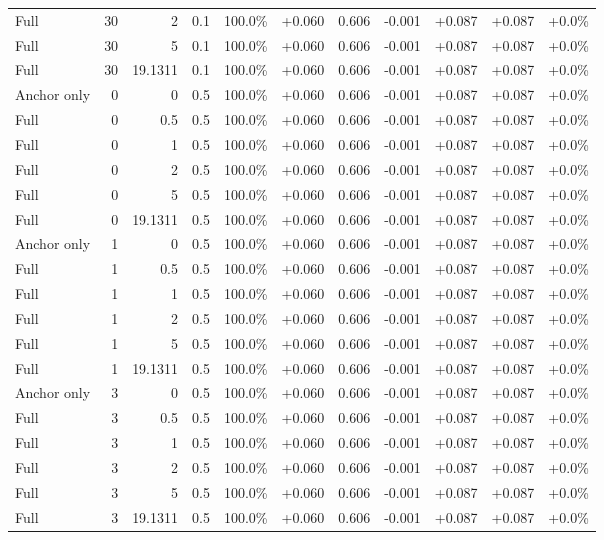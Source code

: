 \begin{table}[htbp]
\begin{tabular}{lrrrccccccc}
Full & 30 & 2 & 0.1 & 100.0\% & +0.060 & 0.606 & -0.001 & +0.087 & +0.087 & +0.0\% \\
Full & 30 & 5 & 0.1 & 100.0\% & +0.060 & 0.606 & -0.001 & +0.087 & +0.087 & +0.0\% \\
Full & 30 & 19.1311 & 0.1 & 100.0\% & +0.060 & 0.606 & -0.001 & +0.087 & +0.087 & +0.0\% \\
Anchor only & 0 & 0 & 0.5 & 100.0\% & +0.060 & 0.606 & -0.001 & +0.087 & +0.087 & +0.0\% \\
Full & 0 & 0.5 & 0.5 & 100.0\% & +0.060 & 0.606 & -0.001 & +0.087 & +0.087 & +0.0\% \\
Full & 0 & 1 & 0.5 & 100.0\% & +0.060 & 0.606 & -0.001 & +0.087 & +0.087 & +0.0\% \\
Full & 0 & 2 & 0.5 & 100.0\% & +0.060 & 0.606 & -0.001 & +0.087 & +0.087 & +0.0\% \\
Full & 0 & 5 & 0.5 & 100.0\% & +0.060 & 0.606 & -0.001 & +0.087 & +0.087 & +0.0\% \\
Full & 0 & 19.1311 & 0.5 & 100.0\% & +0.060 & 0.606 & -0.001 & +0.087 & +0.087 & +0.0\% \\
Anchor only & 1 & 0 & 0.5 & 100.0\% & +0.060 & 0.606 & -0.001 & +0.087 & +0.087 & +0.0\% \\
Full & 1 & 0.5 & 0.5 & 100.0\% & +0.060 & 0.606 & -0.001 & +0.087 & +0.087 & +0.0\% \\
Full & 1 & 1 & 0.5 & 100.0\% & +0.060 & 0.606 & -0.001 & +0.087 & +0.087 & +0.0\% \\
Full & 1 & 2 & 0.5 & 100.0\% & +0.060 & 0.606 & -0.001 & +0.087 & +0.087 & +0.0\% \\
Full & 1 & 5 & 0.5 & 100.0\% & +0.060 & 0.606 & -0.001 & +0.087 & +0.087 & +0.0\% \\
Full & 1 & 19.1311 & 0.5 & 100.0\% & +0.060 & 0.606 & -0.001 & +0.087 & +0.087 & +0.0\% \\
Anchor only & 3 & 0 & 0.5 & 100.0\% & +0.060 & 0.606 & -0.001 & +0.087 & +0.087 & +0.0\% \\
Full & 3 & 0.5 & 0.5 & 100.0\% & +0.060 & 0.606 & -0.001 & +0.087 & +0.087 & +0.0\% \\
Full & 3 & 1 & 0.5 & 100.0\% & +0.060 & 0.606 & -0.001 & +0.087 & +0.087 & +0.0\% \\
Full & 3 & 2 & 0.5 & 100.0\% & +0.060 & 0.606 & -0.001 & +0.087 & +0.087 & +0.0\% \\
Full & 3 & 5 & 0.5 & 100.0\% & +0.060 & 0.606 & -0.001 & +0.087 & +0.087 & +0.0\% \\
Full & 3 & 19.1311 & 0.5 & 100.0\% & +0.060 & 0.606 & -0.001 & +0.087 & +0.087 & +0.0\% \\

\end{tabular}
\end{table}
